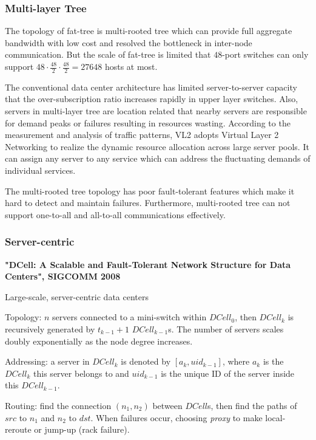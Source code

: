 \documentclass[journal,onecolumn,11pt]{IEEEtran}
\begin{document}
\subsubsection{Multi-layer Tree}

The topology of fat-tree is multi-rooted tree which can provide full aggregate bandwidth with low cost and resolved the bottleneck in inter-node communication. But the scale of fat-tree is limited that $48$-port switches can only support $48 \cdot \frac{48}{2} \cdot \frac{48}{2}=27648$ hosts at most.

The conventional data center architecture has limited server-to-server capacity that the over-subscription ratio increases rapidly in upper layer switches. Also, servers in multi-layer tree are location related that nearby servers are responsible for demand peaks or failures resulting in resources wasting. According to the measurement and analysis of traffic patterns, VL2 adopts Virtual Layer 2 Networking to realize the dynamic resource allocation across large server pools. It can assign any server to any service which can address the fluctuating demands of individual services.

The multi-rooted tree topology has poor fault-tolerant features which make it hard to detect and maintain failures. Furthermore, multi-rooted tree can not support one-to-all and all-to-all communications effectively.


\subsubsection{Server-centric}

\textbf{"DCell: A Scalable and Fault-Tolerant Network Structure for Data Centers", SIGCOMM 2008}

Large-scale, server-centric data centers

Topology:
$n$ servers connected to a mini-switch within $DCell_0$, then $DCell_k$ is recursively generated by $t_{k-1}+1$ $DCell_{k-1}$s. The number of servers scales doubly exponentially as the node degree increases.

Addressing:
a server in $DCell_k$ is denoted by $[a_k,uid_{k-1}]$, where $a_k$ is the $DCell_k$ this server belongs to and $uid_{k-1}$ is the unique ID of the server inside this $DCell_{k-1}$.

Routing: find the connection $(n_1,n_2)$ between $DCell$s, then find the paths of $src$ to $n_1$ and $n_2$ to $dst$. When failures occur, choosing \textit{proxy} to make local-reroute or jump-up (rack failure).
\end{document}
